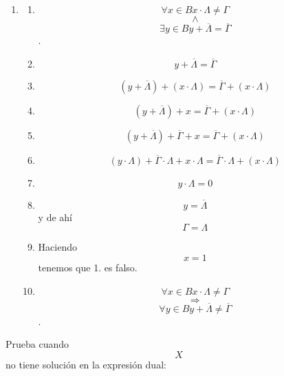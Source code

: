 \begin{enumerate}
\begin{enumerate}
\begin{enumerate}
\begin{enumerate}
\begin{enumerate}
          \begin{enumerate}
          \def\labelenumvi{\arabic{enumvi}.}
          \tightlist
          \item
            \begin{enumerate}
            \def\labelenumvii{\arabic{enumvii}.}
            \tightlist
            \item
              \[\forall{x \in B}{{x \cdot \Lambda} \neq \Gamma}\]\[\land\]\[\exists{y \in B}{{y + \overline{\Lambda}} = \overline{\Gamma}}\].
            \item
              \[{y + \overline{\Lambda}} = \overline{\Gamma}\]
            \item
              \[{\left( {y + \overline{\Lambda}} \right) + \left( {x \cdot \Lambda} \right)} = {\overline{\Gamma} + \left( {x \cdot \Lambda} \right)}\]
            \item
              \[{\left( {y + \overline{\Lambda}} \right) + x} = {\overline{\Gamma} + \left( {x \cdot \Lambda} \right)}\]
            \item
              \[{{\left( {y + \overline{\Lambda}} \right) + \overline{\Gamma}} + x} = {\overline{\Gamma} + \left( {x \cdot \Lambda} \right)}\]
            \item
              \[{{\left( {y \cdot \Lambda} \right) + {\overline{\Gamma} \cdot \Lambda}} + {x \cdot \Lambda}} = {{\overline{\Gamma} \cdot \Lambda} + \left( {x \cdot \Lambda} \right)}\]
            \item
              \[{y \cdot \Lambda} = 0\]
            \item
              \[y = \overline{\Lambda}\] y de ahí \[\Gamma = \Lambda\]
            \item
              Haciendo \[x = 1\] tenemos que 1. es falso.
            \item
              \[\forall{x \in B}{{x \cdot \Lambda} \neq \Gamma}\]\[\Rightarrow\]\[\forall{y \in B}{{y + \overline{\Lambda}} \neq \overline{\Gamma}}\].
            \end{enumerate}
          \end{enumerate}

          Prueba cuando \[X\] no tiene solución en la expresión dual:


\end{enumerate}
\end{enumerate}
\end{enumerate}
\end{enumerate}
\end{enumerate}
